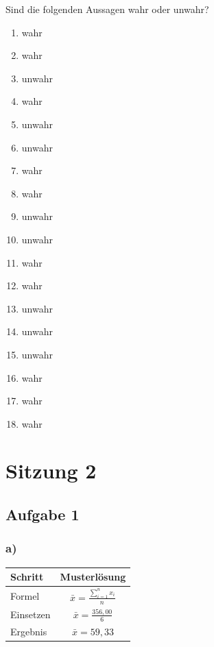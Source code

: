 \documentclass[
  11pt,
  ngerman,
  a4paper,
]{report}
\providecommand{\tightlist}{%
  \setlength{\itemsep}{0pt}\setlength{\parskip}{0pt}}
\begin{document}
Sind die folgenden Aussagen wahr oder unwahr?

\begin{enumerate}
\def\labelenumi{\alph{enumi})}
\tightlist
\item
  wahr
\item
  wahr
\item
  unwahr
\item
  wahr
\item
  unwahr
\item
  unwahr
\item
  wahr
\item
  wahr
\item
  unwahr
\item
  unwahr
\item
  wahr
\item
  wahr
\item
  unwahr
\item
  unwahr
\item
  unwahr
\item
  wahr
\item
  wahr
\item
  wahr
\end{enumerate}

\hypertarget{sitzung-2}{%
\section*{Sitzung 2}\label{sitzung-2}}

\hypertarget{aufgabe-1-2}{%
\subsection{Aufgabe 1}\label{aufgabe-1-2}}

\hypertarget{a-2}{%
\subsubsection{a)}\label{a-2}}

\begin{table}[H]
\centering
\begin{tabular}{lc}
\toprule
Schritt & Musterlösung\\
\midrule
Formel & $\bar{x}=\frac{\sum\limits_{i=1}^{n}x_{i}}{n}$\\
Einsetzen & $\bar{x}=\frac{356{,}00}{6}$\\
Ergebnis & $\bar{x}=59{,}33$\\
\bottomrule
\end{tabular}
\end{table}
\end{document}
